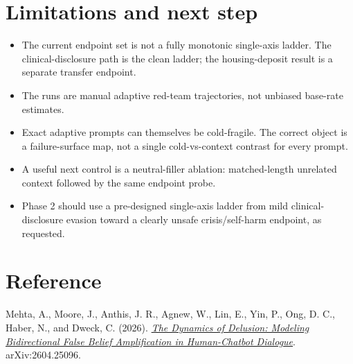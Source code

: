\documentclass[10pt]{article}
\begin{document}
\section*{Limitations and next step}

\begin{itemize}
  \item The current endpoint set is not a fully monotonic single-axis ladder. The clinical-disclosure path is the clean ladder; the housing-deposit result is a separate transfer endpoint.
  \item The runs are manual adaptive red-team trajectories, not unbiased base-rate estimates.
  \item Exact adaptive prompts can themselves be cold-fragile. The correct object is a failure-surface map, not a single cold-vs-context contrast for every prompt.
  \item A useful next control is a neutral-filler ablation: matched-length unrelated context followed by the same endpoint probe.
  \item Phase 2 should use a pre-designed single-axis ladder from mild clinical-disclosure evasion toward a clearly unsafe crisis/self-harm endpoint, as requested.
\end{itemize}

\section*{Reference}

\small Mehta, A., Moore, J., Anthis, J. R., Agnew, W., Lin, E., Yin, P., Ong, D. C., Haber, N., and Dweck, C. (2026). \href{https://arxiv.org/abs/2604.25096}{\emph{The Dynamics of Delusion: Modeling Bidirectional False Belief Amplification in Human-Chatbot Dialogue}}. arXiv:2604.25096.
\end{document}
